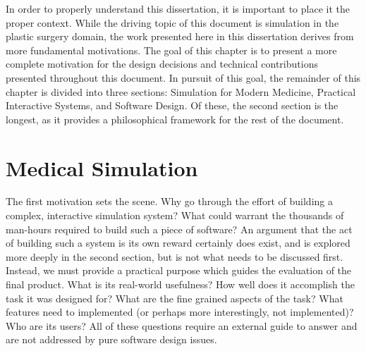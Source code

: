 \documentclass[12pt,oneside,letterpaper]{memoir}
\begin{document}
In order to properly understand this dissertation, it is important to
place it the proper context. While the driving topic of this document
is simulation in the plastic surgery domain, the work presented here
in this dissertation derives from more fundamental motivations. The
goal of this chapter is to present a more complete motivation for the
design decisions and technical contributions presented throughout this
document.  In pursuit of this goal, the remainder of this chapter is
divided into three sections: Simulation for Modern Medicine, Practical
Interactive Systems, and Software Design. Of these, the second section
is the longest, as it provides a philosophical framework for the rest
of the document.

\section{Medical Simulation}

The first motivation sets the scene. Why go through the effort of
building a complex, interactive simulation system? What could warrant
the thousands of man-hours required to build such a piece of software?
An argument that the act of building such a system is its own reward
certainly does exist, and is explored more deeply in the second
section, but is not what needs to be discussed first. Instead, we must
provide a practical purpose which guides the evaluation of the final
product. What is its real-world usefulness? How well does it
accomplish the task it was designed for?  What are the fine grained
aspects of the task? What features need to implemented (or perhaps
more interestingly, not implemented)? Who are its users? All of these
questions require an external guide to answer and are not addressed by
pure software design issues.
\end{document}
